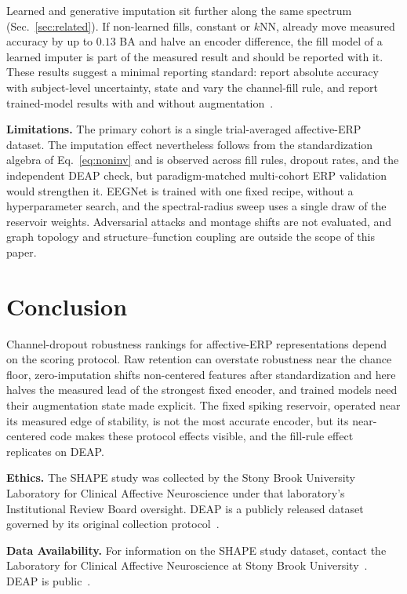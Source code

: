 \documentclass[conference]{IEEEtran}
\begin{document}
Learned and generative imputation sit further along the same spectrum (Sec.~\ref{sec:related}). If non-learned fills, constant or $k$NN, already move measured accuracy by up to $0.13$ BA and halve an encoder difference, the fill model of a learned imputer is part of the measured result and should be reported with it. These results suggest a minimal reporting standard: report absolute accuracy with subject-level uncertainty, state and vary the channel-fill rule, and report trained-model results with and without augmentation~\cite{rommel2022augment}.

\textbf{Limitations.} The primary cohort is a single trial-averaged affective-ERP dataset. The imputation effect nevertheless follows from the standardization algebra of Eq.~\eqref{eq:noninv} and is observed across fill rules, dropout rates, and the independent DEAP check, but paradigm-matched multi-cohort ERP validation would strengthen it. EEGNet is trained with one fixed recipe, without a hyperparameter search, and the spectral-radius sweep uses a single draw of the reservoir weights. Adversarial attacks and montage shifts are not evaluated, and graph topology and structure--function coupling are outside the scope of this paper.

\section{Conclusion}
Channel-dropout robustness rankings for affective-ERP representations depend on the scoring protocol. Raw retention can overstate robustness near the chance floor, zero-imputation shifts non-centered features after standardization and here halves the measured lead of the strongest fixed encoder, and trained models need their augmentation state made explicit. The fixed spiking reservoir, operated near its measured edge of stability, is not the most accurate encoder, but its near-centered code makes these protocol effects visible, and the fill-rule effect replicates on DEAP.

\textbf{Ethics.} The SHAPE study was collected by the Stony Brook University Laboratory for Clinical Affective Neuroscience under that laboratory's Institutional Review Board oversight. DEAP is a publicly released dataset governed by its original collection protocol~\cite{koelstra2012deap}.

\textbf{Data Availability.} For information on the SHAPE study dataset, contact the Laboratory for Clinical Affective Neuroscience at Stony Brook University~\cite{shape}. DEAP is public~\cite{koelstra2012deap}.
\end{document}
